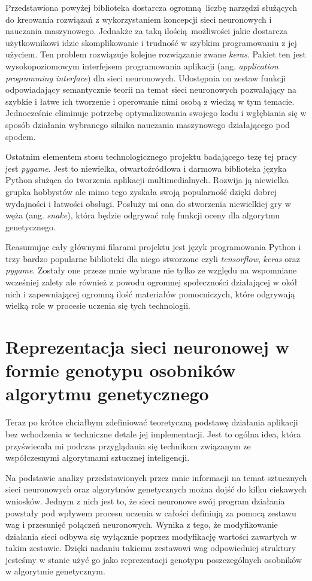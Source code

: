 \documentclass[12pt, oneside, a4paper]{report}
\begin{document}
Przedstawiona powyżej biblioteka dostarcza ogromną liczbę narzędzi służących do kreowania rozwiązań z wykorzystaniem koncepcji sieci neuronowych i nauczania maszynowego. Jednakże za taką ilością możliwości jakie dostarcza użytkownikowi idzie skomplikowanie i trudność w szybkim programowaniu z jej użyciem. Ten problem rozwiązuje kolejne rozwiązanie zwane \textit{keras}. Pakiet ten jest wysokopoziomowym interfejsem programowania aplikacji (ang. \textit{application programming interface}) dla sieci neuronowych. Udostępnia on zestaw funkcji odpowiadający semantycznie teorii na temat sieci neuronowych pozwalający na szybkie i łatwe ich tworzenie i operowanie nimi osobą z wiedzą w tym temacie. Jednocześnie eliminuje potrzebę optymalizowania swojego kodu i wgłębiania się w sposób działania wybranego silnika nauczania maszynowego działającego pod spodem.

Ostatnim elementem stosu technologicznego projektu badającego tezę tej pracy jest \textit{pygame}. Jest to niewielka, otwartoźródłowa i darmowa biblioteka języka Python służąca do tworzenia aplikacji multimedialnych. Rozwija ją niewielka grupka hobbystów ale mimo tego zyskała swoją popularność dzięki dobrej wydajności i łatwości obsługi. Posłuży mi ona do stworzenia niewielkiej gry w węża (ang. \textit{snake}), która będzie odgrywać rolę funkcji oceny dla algorytmu genetycznego.

Reasumując cały głównymi filarami projektu jest język programowania Python i trzy bardzo popularne biblioteki dla niego stworzone czyli \textit{tensorflow}, \textit{keras} oraz \textit{pygame}. Zostały one przeze mnie wybrane nie tylko ze względu na wspomniane wcześniej zalety ale również z powodu ogromnej społeczności działającej w okół nich i zapewniającej ogromną ilość materiałów pomocniczych, które odgrywają wielką role w procesie uczenia się tych technologii.

\section{Reprezentacja sieci neuronowej w formie genotypu osobników algorytmu genetycznego}

Teraz po krótce chciałbym zdefiniować teoretyczną podstawę działania aplikacji bez wchodzenia w techniczne detale jej implementacji. Jest to ogólna idea, która przyświecała mi podczas przyglądania się technikom związanym ze współczesnymi algorytmami sztucznej inteligencji.

Na podstawie analizy przedstawionych przez mnie informacji na temat sztucznych sieci neuronowych oraz algorytmów genetycznych można dojść do kilku ciekawych wniosków. Jednym z nich jest to, że sieci neuronowe swój program działania powstały pod wpływem procesu uczenia w całości definiują za pomocą zestawu wag i przesunięć połączeń neuronowych. Wynika z tego, że modyfikowanie działania sieci odbywa się wyłącznie poprzez modyfikację wartości zawartych w takim zestawie. Dzięki nadaniu takiemu zestawowi wag odpowiedniej struktury jesteśmy w stanie użyć go jako reprezentacji genotypu poszczególnych osobników w algorytmie genetycznym.
\end{document}
